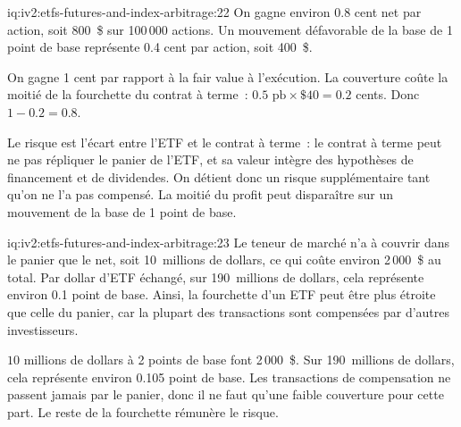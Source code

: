 \begin{solution}{iq:iv2:etfs-futures-and-index-arbitrage:22}
On gagne environ 0.8 cent net par action, soit 800~\$ sur 100\,000 actions. Un mouvement défavorable de la base de 1 point de base représente 0.4 cent par action, soit 400~\$.

On gagne 1 cent par rapport à la fair value à l'exécution. La couverture coûte la moitié de la fourchette du contrat à terme~: $0.5 \text{ pb} \times \$40 = 0.2$ cents. Donc $1 - 0.2 = 0.8$.

Le risque est l'écart entre l'ETF et le contrat à terme~: le contrat à terme peut ne pas répliquer le panier de l'ETF, et sa valeur intègre des hypothèses de financement et de dividendes. On détient donc un risque supplémentaire tant qu'on ne l'a pas compensé. La moitié du profit peut disparaître sur un mouvement de la base de 1 point de base.

\end{solution}

\begin{solution}{iq:iv2:etfs-futures-and-index-arbitrage:23}
Le teneur de marché n'a à couvrir dans le panier que le net, soit 10~millions de dollars, ce qui coûte environ 2\,000~\$ au total. Par dollar d'ETF échangé, sur 190~millions de dollars, cela représente environ 0.1 point de base. Ainsi, la fourchette d'un ETF peut être plus étroite que celle du panier, car la plupart des transactions sont compensées par d'autres investisseurs.

$10$ millions de dollars à 2 points de base font 2\,000~\$. Sur 190~millions de dollars, cela représente environ 0.105 point de base. Les transactions de compensation ne passent jamais par le panier, donc il ne faut qu'une faible couverture pour cette part. Le reste de la fourchette rémunère le risque.

\end{solution}

